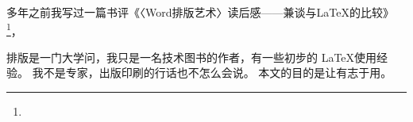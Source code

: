 多年之前我写过一篇书评《〈Word排版艺术〉读后感——兼谈与LaTeX的比较》
\footnote{}，

排版是一门大学问，我只是一名技术图书的作者，有一些初步的 \LaTeX 使用经验。
我不是专家，出版印刷的行话也不怎么会说。
本文的目的是让有志于用。